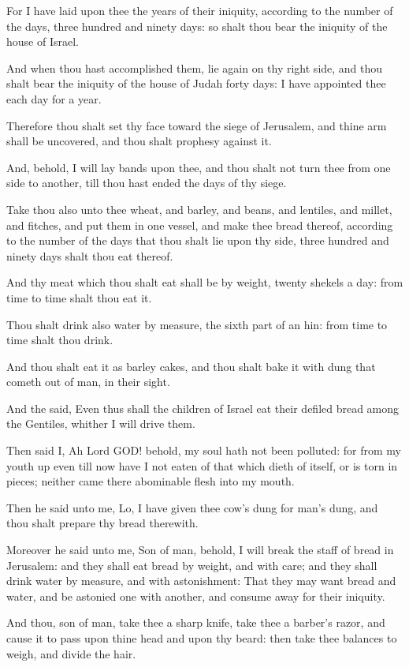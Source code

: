 \Verse For I have laid upon thee the years of their iniquity, according to the number of the days, three hundred and ninety days: so shalt thou bear the iniquity of the house of Israel.

\Verse And when thou hast accomplished them, lie again on thy right side, and thou shalt bear the iniquity of the house of Judah forty days: I have appointed thee each day for a year.

\Verse Therefore thou shalt set thy face toward the siege of Jerusalem, and thine arm shall be uncovered, and thou shalt prophesy against it.

\Verse And, behold, I will lay bands upon thee, and thou shalt not turn thee from one side to another, till thou hast ended the days of thy siege.

\Verse Take thou also unto thee wheat, and barley, and beans, and lentiles, and millet, and fitches, and put them in one vessel, and make thee bread thereof, according to the number of the days that thou shalt lie upon thy side, three hundred and ninety days shalt thou eat thereof.

\Verse And thy meat which thou shalt eat shall be by weight, twenty shekels a day: from time to time shalt thou eat it.

\Verse Thou shalt drink also water by measure, the sixth part of an hin: from time to time shalt thou drink.

\Verse And thou shalt eat it as barley cakes, and thou shalt bake it with dung that cometh out of man, in their sight.

\Verse And the \LORD said, Even thus shall the children of Israel eat their defiled bread among the Gentiles, whither I will drive them.

\Verse Then said I, Ah Lord GOD! behold, my soul hath not been polluted: for from my youth up even till now have I not eaten of that which dieth of itself, or is torn in pieces; neither came there abominable flesh into my mouth.

\Verse Then he said unto me, Lo, I have given thee cow's dung for man's dung, and thou shalt prepare thy bread therewith.

\Verse Moreover he said unto me, Son of man, behold, I will break the staff of bread in Jerusalem: and they shall eat bread by weight, and with care; and they shall drink water by measure, and with astonishment: \Verse That they may want bread and water, and be astonied one with another, and consume away for their iniquity.


\Chapter
\Verse And thou, son of man, take thee a sharp knife, take thee a barber's razor, and cause it to pass upon thine head and upon thy beard: then take thee balances to weigh, and divide the hair.

